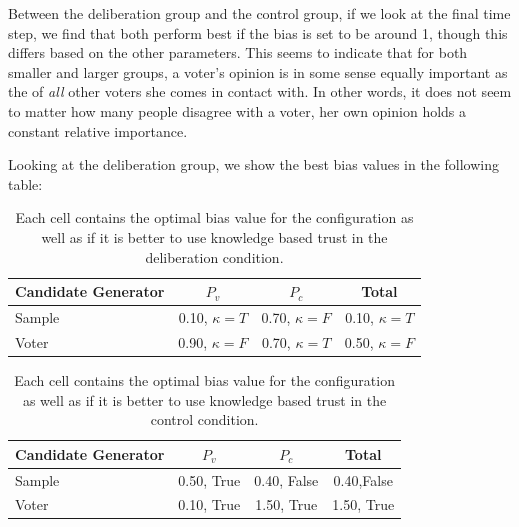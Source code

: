 Between the deliberation group and the control group, if we look at the final
time step, we find that both perform best if the bias is set to be around 1,
though this differs based on the other parameters. This seems to indicate that
for both smaller and larger groups, a voter's opinion is in some sense equally
important as the of  \textit{all} other voters she comes in contact with. In
other words, it does not seem to matter how many people disagree with a voter,
her own opinion holds a constant relative importance.

Looking at the deliberation group, we show the best bias values in the following table:
\begin{table}
	\begin{center}
		\begin{tabular}{lccc}
			\toprule
			Candidate Generator & $P_{v}$            & $P_{c}$           & Total             \\
			\midrule
			Sample              & 0.10, $\kappa = T$ & 0.70, $\kappa =F$ & 0.10, $\kappa =T$ \\
			Voter               & 0.90, $\kappa =F$  & 0.70, $\kappa =T$ & 0.50, $\kappa =F$ \\
			\bottomrule
		\end{tabular}
		\caption{Each cell contains the optimal bias value for the configuration as well as if it is better to use knowledge based trust in the deliberation condition.}\label{tab:opt_delib}
	\end{center}
\end{table}
\begin{table}
	\begin{center}
		\begin{tabular}{lccc}
			\toprule
			Candidate Generator & $P_{v}$    & $P_{c}$     & Total      \\
			\midrule
			Sample              & 0.50, True & 0.40, False & 0.40,False \\
			Voter               & 0.10, True & 1.50, True  & 1.50, True \\
			\bottomrule
		\end{tabular}
		\caption{Each cell contains the optimal bias value for the configuration as well as if it is better to use knowledge based trust in the control condition.}\label{tab:opt_control}
	\end{center}
\end{table}

